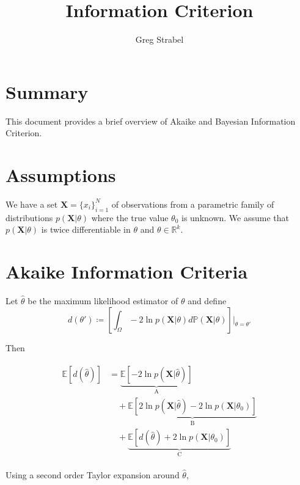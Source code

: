 \documentclass[11pt]{article}
\author{Greg Strabel}
\title{Information Criterion}
\begin{document}
\maketitle

\tableofcontents

\section{Summary}
This document provides a brief overview of Akaike and Bayesian Information Criterion.

\section{Assumptions}

We have a set $\mathbf{X} = \{ x_i \}_{i = 1}^{N}$ of observations from a parametric family of distributions $p(\mathbf{X} \vert \theta)$ where the true value $\theta_0$ is unknown. We assume that $p(\mathbf{X} \vert \theta)$ is twice differentiable in $\theta$ and $\theta \in \mathbb{R}^k$.

\section{Akaike Information Criteria}

Let $\hat{\theta}$ be the maximum likelihood estimator of $\theta$ and define 
\begin{equation}
d(\theta') \coloneqq \left[ \int_{\Omega}-2\ln{p(\mathbf{X} \vert \theta)} d\mathbb{P}(\mathbf{X} \vert \theta) \right] \vert_{\theta=\theta'}
\end{equation}

Then

\begin{align}
\begin{split}
\mathbb{E} \left[ d \left( \hat{\theta} \right) \right] &= \underbrace{\mathbb{E} \left[ -2\ln{p(\mathbf{X} \vert \hat{\theta})} \right]}_{\text{A}} \\
& \quad + \underbrace{ \mathbb{E} \left[ 2 \ln{p( \mathbf{X} \vert \hat{\theta})} - 2 \ln{p( \mathbf{X} \vert \theta_0)} \right] }_{\text{B}} \\
& \quad + \underbrace{ \mathbb{E} \left[ d(\hat{\theta}) + 2 \ln{p(\mathbf{X} \vert \theta_0)} \right] }_{\text{C}}
\end{split}
\end{align}

Using a second order Taylor expansion around $\hat{\theta}$,
\end{document}
